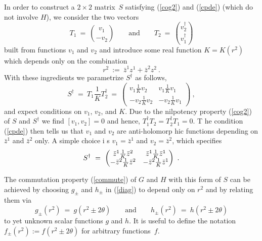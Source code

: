\documentclass[a4paper,11pt,english]{article}
\numberwithin{equation}{section}
\renewcommand{\=}{\ =\ }
\begin{document}
In order to construct a $2{\times}2$ matrix~$S$ satisfying 
(\ref{cog2}) and (\ref{cpde}) (which do not involve $H$),
we consider the two vectors
\begin{equation}
 T_1\=\binom{v_1}{-v_2}\qquad\text{and}\qquad 
 T_2\=\binom{{v}^{\dagger}_2}{{v}^{\dagger}_1}
\end{equation}
built from functions $v_1$ and $v_2$ and introduce 
some real function $K=K(r^2)$ which depends only on the combination
\begin{equation}
 r^2\ :=\ \bar{z}^1z^1+\bar{z}^2z^2\ .
\end{equation}
With these ingredients we parametrize $S^\dagger$ as follows,
\begin{equation}
 S^\dagger\=T_1\frac{1}{K}T^\dagger_2\=\begin{pmatrix} 
 v_1\frac{1}{K}v_2  &  v_1\frac{1}{K}v_1 \\
 -v_2\frac{1}{K}v_2 & -v_2\frac{1}{K}v_1 \end{pmatrix}\ ,
\end{equation}
and expect conditions on $v_1$, $v_2$, and $K$.
Due to the nilpotency property (\ref{cog2}) of $S$ and $S^\dagger$ we %
 find $[v_1,v_2]=0$ and hence, $T^\dagger_1T_2=T^\dagger_2T_1=0$. T%
he condition (\ref{cpde}) then tells us that $v_1$ and $v_2$ are anti-holomorp%
hic functions depending on $\bar{z}^1$ and $\bar{z}^2$ only. A simple choice i%
s $v_1=\bar{z}^1$ and $v_2=\bar{z}^2$, which specifies 
\begin{equation}
 S^\dagger \= \begin{pmatrix} \bar{z}^1\frac{1}{K}\bar{z}^2  & \bar{z}^1%
 \frac{1}{K}\bar{z}^1 \\%
                     -\bar{z}^2\frac{1}{K}\bar{z}^2 & -\bar{z}^2\frac{1}{%
 K}\bar{z}^1 \end{pmatrix}\ .
\end{equation}

The commutation property (\ref{commute}) of $G$ and $H$ with this form of $S$ 
can be achieved by choosing $g_\pm$ and $h_\pm$ in (\ref{diag})
to depend only on $r^2$ and by relating them via
\begin{equation}
 g_\pm(r^2)\=g(r^2\pm 2\theta) \qquad\text{and}\qquad
 h_\pm(r^2)\=h(r^2\pm 2\theta)
\end{equation}
to yet unknown scalar functions $g$ and $h$.
It is useful to define the notation $f_\pm(r^2):=f(r^2\pm 2\theta)$
for arbitrary functions~$f$.
\end{document}
